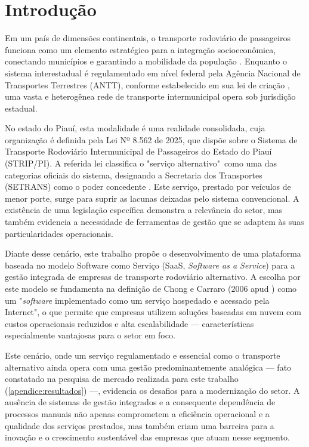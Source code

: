 \chapter{Introdução}\label{cha:introducao}

Em um país de dimensões continentais, o transporte rodoviário de passageiros funciona como um elemento estratégico para a integração socioeconômica, conectando municípios e garantindo a mobilidade da população \cite{FGV2023}. Enquanto o sistema interestadual é regulamentado em nível federal pela Agência Nacional de Transportes Terrestres (ANTT), conforme estabelecido em sua lei de criação \cite{BRASIL2001}, uma vasta e heterogênea rede de transporte intermunicipal opera sob jurisdição estadual.

No estado do Piauí, esta modalidade é uma realidade consolidada, cuja organização é definida pela Lei Nº 8.562 de 2025, que dispõe sobre o Sistema de Transporte Rodoviário Intermunicipal de Passageiros do Estado do Piauí (STRIP/PI). A referida lei classifica o "serviço alternativo"\ como uma das categorias oficiais do sistema, designando a Secretaria dos Transportes (SETRANS) como o poder concedente \cite{PIAUI2025}. Este serviço, prestado por veículos de menor porte, surge para suprir as lacunas deixadas pelo sistema convencional. A existência de uma legislação específica demonstra a relevância do setor, mas também evidencia a necessidade de ferramentas de gestão que se adaptem às suas particularidades operacionais.

Diante desse cenário, este trabalho propõe o desenvolvimento de uma plataforma
baseada no modelo Software como Serviço (SaaS, \textit{Software as a Service})
para a gestão integrada de empresas de transporte rodoviário alternativo.
A escolha por este modelo se fundamenta na definição de Chong e Carraro
(2006 apud \textcite{melo2007software}) como um "\textit{software} implementado como um serviço hospedado e acessado pela Internet", o que permite que empresas
utilizem soluções baseadas em nuvem com custos operacionais reduzidos e alta
escalabilidade --- características especialmente vantajosas para o setor em foco.

Este cenário, onde um serviço regulamentado e essencial como o transporte alternativo ainda opera com uma gestão predominantemente analógica — fato constatado na pesquisa de mercado realizada para este trabalho (\autoref{apendice:resultados}) —, evidencia os desafios para a modernização do setor. A ausência de sistemas de gestão integrados e a consequente dependência de processos manuais não apenas comprometem a eficiência operacional e a qualidade dos serviços prestados, mas também criam uma barreira para a inovação e o crescimento sustentável das empresas que atuam nesse segmento.


